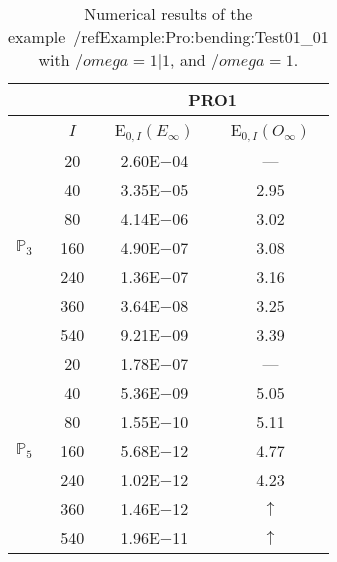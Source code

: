 \begin{table}[H]
\caption{Numerical results of the example~/ref{Example:Pro:bending:Test01_01} with $/omega=1|1$, and $/omega=1$.}
\setlength{\tabcolsep}{5pt}
\centering
\begin{tabular}{@{}l c c c@{}}
\toprule
 &  & \multicolumn{2}{c}{PRO1}\\
\midrule
 & $I$ & E$_{0,I}(E_{\infty})$ & E$_{0,I}(O_{\infty})$\\
\midrule
\multirow{7}{*}{$\mathbb{P}_{3}$}
 & 20 & 2.60E$-$04 & ---\\
 & 40 & 3.35E$-$05 & 2.95\\
 & 80 & 4.14E$-$06 & 3.02\\
 & 160 & 4.90E$-$07 & 3.08\\
 & 240 & 1.36E$-$07 & 3.16\\
 & 360 & 3.64E$-$08 & 3.25\\
 & 540 & 9.21E$-$09 & 3.39\\
\midrule
\multirow{7}{*}{$\mathbb{P}_{5}$}
 & 20 & 1.78E$-$07 & ---\\
 & 40 & 5.36E$-$09 & 5.05\\
 & 80 & 1.55E$-$10 & 5.11\\
 & 160 & 5.68E$-$12 & 4.77\\
 & 240 & 1.02E$-$12 & 4.23\\
 & 360 & 1.46E$-$12 & $\uparrow$\\
 & 540 & 1.96E$-$11 & $\uparrow$\\
\bottomrule
\end{tabular}
\label{Table:PRO:test_01_01_test5_pro1}
\end{table}
